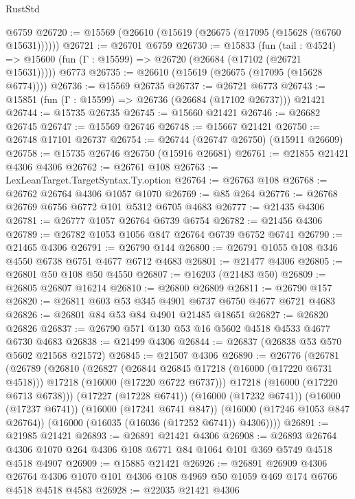 \begin{lexlean}{RustStd}
\begin{coremodule}
    @6759
@26720 := @15569 (@26610 (@15619 (@26675 (@17095 (@15628 (@6760 @15631))))))
@26721 := @26701 @6759
@26730 := @15833
    (fun (tail : @4524) => @15600 (fun (Γ : @15599) => @26720 (@26684 (@17102 (@26721 @15631)))))
    @6773
@26735 := @26610 (@15619 (@26675 (@17095 (@15628 @6774))))
@26736 := @15569 @26735
@26737 := @26721 @6773
@26743 := @15851 (fun (Γ : @15599) => @26736 (@26684 (@17102 @26737))) @21421
@26744 := @15735 @26735
@26745 := @15660 @21421
@26746 := @26682 @26745
@26747 := @15569 @26746
@26748 := @15667 @21421
@26750 := @26748 @17101 @26737
@26754 := @26744 (@26747 @26750) (@15911 @26609)
@26758 := @15735 @26746 @26750 (@15916 @26681)
@26761 := @21855 @21421 @4306 @4306
@26762 := @26761 @108
@26763 := LexLeanTarget.TargetSyntax.Ty.option
@26764 := @26763 @108
@26768 := @26762 @26764 @4306 @1057 @1070
@26769 := @85 @264
@26776 := @26768 @26769 @6756 @6772 @101 @5312 @6705 @4683
@26777 := @21435 @4306
@26781 := @26777 @1057 @26764 @6739 @6754
@26782 := @21456 @4306
@26789 := @26782 @1053 @1056 @847 @26764 @6739 @6752 @6741
@26790 := @21465 @4306
@26791 := @26790 @144
@26800 := @26791 @1055 @108 @346 @4550 @6738 @6751 @4677 @6712 @4683
@26801 := @21477 @4306
@26805 := @26801 @50 @108 @50 @4550
@26807 := @16203 (@21483 @50)
@26809 := @26805 @26807 @16214
@26810 := @26800 @26809
@26811 := @26790 @157
@26820 := @26811 @603 @53 @345 @4901 @6737 @6750 @4677 @6721 @4683
@26826 := @26801 @84 @53 @84 @4901 @21485 @18651
@26827 := @26820 @26826
@26837 := @26790 @571 @130 @53 @16 @5602 @4518 @4533 @4677 @6730 @4683
@26838 := @21499 @4306
@26844 := @26837 (@26838 @53 @570 @5602 @21568 @21572)
@26845 := @21507 @4306
@26890 := @26776
    (@26781
      (@26789
        (@26810
          (@26827
            (@26844 @26845 @17218 (@16000 (@17220 @6731 @4518)))
            @17218
            (@16000 (@17220 @6722 @6737)))
          @17218
          (@16000 (@17220 @6713 @6738)))
        (@17227 (@17228 @6741))
        (@16000 (@17232 @6741))
        (@16000 (@17237 @6741))
        (@16000 (@17241 @6741 @847))
        (@16000 (@17246 @1053 @847 @26764))
        (@16000 (@16035 (@16036 (@17252 @6741)) @4306))))
@26891 := @21985 @21421
@26893 := @26891 @21421 @4306
@26908 := @26893
    @26764
    @4306
    @1070
    @264
    @4306
    @108
    @6771
    @84
    @1064
    @101
    @369
    @5749
    @4518
    @4518
    @4907
@26909 := @15885 @21421
@26926 := @26891
    @26909
    @4306
    @26764
    @4306
    @1070
    @101
    @4306
    @108
    @4969
    @50
    @1059
    @469
    @174
    @6766
    @4518
    @4518
    @4583
@26928 := @22035 @21421 @4306

\end{coremodule}
\end{lexlean}
